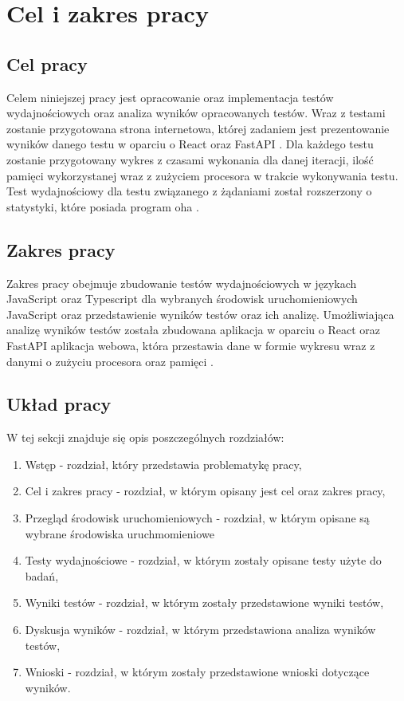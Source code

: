 \section*{Cel i zakres pracy}

\subsection*{Cel pracy}
Celem niniejszej pracy jest opracowanie oraz implementacja testów wydajnościowych oraz analiza wyników opracowanych testów. Wraz z testami zostanie przygotowana strona internetowa, której zadaniem jest prezentowanie wyników danego testu w oparciu o React \cite{React} oraz FastAPI \cite{FastAPI}. Dla każdego testu zostanie przygotowany wykres z czasami wykonania dla danej iteracji, ilość pamięci wykorzystanej wraz z zużyciem procesora w trakcie wykonywania testu. Test wydajnościowy dla testu związanego z żądaniami  został rozszerzony o statystyki, które posiada program oha \cite{oha}.

\subsection*{Zakres pracy}
Zakres pracy obejmuje zbudowanie testów wydajnościowych w językach JavaScript oraz Typescript dla wybranych środowisk uruchomieniowych JavaScript oraz przedstawienie wyników testów oraz ich analizę. Umożliwiająca analizę wyników testów została zbudowana aplikacja w oparciu o React \cite{React} oraz FastAPI \cite{FastAPI} aplikacja webowa, która przestawia dane w formie wykresu wraz z danymi o zużyciu procesora oraz pamięci .

\subsection*{Układ pracy}
W tej sekcji znajduje się opis poszczególnych rozdziałów:
\begin{enumerate}
  \item Wstęp - rozdział, który przedstawia problematykę pracy,
  \item Cel i zakres pracy - rozdział, w którym opisany jest cel oraz zakres pracy,
  \item Przegląd środowisk uruchomieniowych - rozdział, w którym opisane są wybrane środowiska uruchmomieniowe
  \item Testy wydajnościowe - rozdział, w którym zostały opisane testy użyte do badań,
  \item Wyniki testów - rozdział, w którym zostały przedstawione wyniki testów,
  \item Dyskusja wyników - rozdział, w którym przedstawiona analiza wyników testów, 
  \item Wnioski - rozdział, w którym zostały przedstawione wnioski dotyczące wyników.
\end{enumerate}